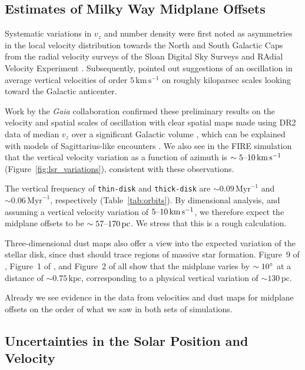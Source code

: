\documentclass[twocolumn]{aastex62}
\newcommand{\pc}{\text{pc}}
\newcommand{\kpc}{\text{kpc}}
\newcommand{\Myr}{\text{Myr}}
\newcommand{\kms}{\text{km}\,\text{s}^{-1}}
\newcommand{\thin}{\texttt{thin-disk}}
\newcommand{\thick}{\texttt{thick-disk}}
\begin{document}
\subsection{Estimates of Milky Way Midplane Offsets}

\label{ssec:mw_data_midplane}

Systematic variations in $v_z$ and number density were first noted as
asymmetries in the local velocity distribution towards the North and South
Galactic Caps from the radial velocity surveys of the Sloan Digital Sky
Surveys \citep{2012ApJ...750L..41W} and RAdial Velocity Experiment
\citep{2013MNRAS.436..101W}. Subsequently, \citet{2013ApJ...777L...5C} pointed
out suggestions of an oscillation in average vertical velocities of order
$5\,\kms$ on roughly kiloparsec scales looking toward the Galactic anticenter.

Work by the \textit{Gaia} collaboration confirmed these preliminary results on
the velocity and spatial scales of oscillation with clear spatial maps made
using DR2 data of median $v_z$ over a significant Galactic volume
\citep{2018A&A...616A..11G, 2019arXiv190209569F}, which can be explained with
models of Sagittarius-like encounters
\citep{2013MNRAS.429..159G,2018MNRAS.481..286L,2019MNRAS.485.3134L}. We also
see in the FIRE simulation that the vertical velocity variation as a function
of azimuth is $\sim5\textup{--}10\,\kms$ (Figure~\ref{fig:lsr_variations}),
consistent with these observations.

The vertical frequency of \thin{} and \thick{} are $\sim 0.09\,\Myr^{-1}$ and
$\sim0.06\,\Myr^{-1}$, respectively (Table~\ref{tab:orbits}). By dimensional
analysis, and assuming a vertical velocity variation of
$5\textup{--}10\,\kms$, we therefore expect the midplane offsets to be $\sim
57\textup{--}170\,\pc$. We stress that this is a rough calculation.

Three-dimensional dust maps also offer a view into the expected variation of
the stellar disk, since dust should trace regions of massive star formation.
Figure~9 of \citet{2019MNRAS.483.4277C}, Figure~1 of
\citet{2019arXiv190105971L}, and Figure~2 of \citet{2019arXiv190502734G} all
show that the midplane varies by $\sim10\degree$ at a distance of
$\sim0.75\,\kpc$, corresponding to a physical vertical variation of
$\sim130\,\pc$.

Already we see evidence in the data from velocities and dust maps for midplane
offsets on the order of what we saw in both sets of simulations.

\subsection{Uncertainties in the Solar Position and Velocity}\label{ssec:coord_off}
\end{document}
